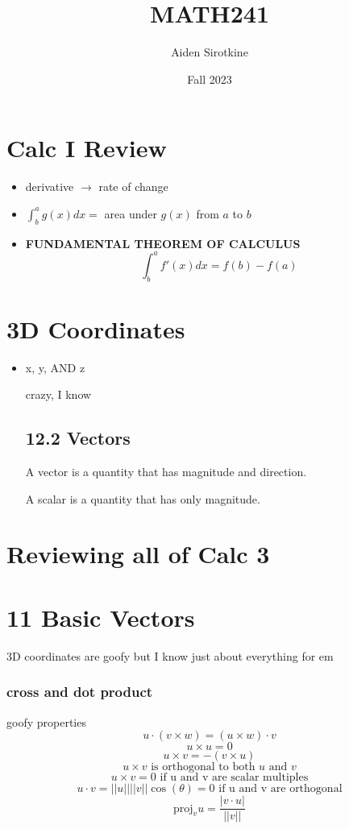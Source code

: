 \documentclass{report}
\date{Fall 2023}
\title{MATH241}
\author{Aiden Sirotkine}
\begin{document}
\pagestyle{fancy}
\maketitle
\tableofcontents


\chapter{Calc I Review}
\begin{itemize}
\item
derivative $\rightarrow$ rate of change

\item
$\int_b^a g(x) dx =$ area under $g(x)$ from $a$ to $b$

\item
\textbf{FUNDAMENTAL THEOREM OF CALCULUS}
$$
\int_b^a f'(x) dx = f(b) - f(a)
$$

\end{itemize}

\chapter{3D Coordinates}
\begin{itemize}
\item
x, y, AND z

crazy, I know

\section*{12.2 Vectors}
A vector is a quantity that has magnitude and direction.

A scalar is a quantity that has only magnitude.


\end{itemize}

\chapter{Reviewing all of Calc 3}


\chapter{11 Basic Vectors}
3D coordinates are goofy but I know just about everything for em

\subsection{cross and dot product}
goofy properties
$$
u \cdot (v \times w) = (u \times w) \cdot v
$$
$$
u \times u = 0
$$
$$
u \times v = -(v \times u)
$$
$$
u \times v \text{ is orthogonal to both } u \text{ and } v
$$
$$
u \times v = 0 \text{ if u and v are scalar multiples}
$$
$$
u \cdot v = 
||u||||v||\cos(\theta) =
0 \text{ if u and v are orthogonal}
$$
$$
\text{proj}_vu = \frac{| v \cdot u |}{||v||}
$$
\end{document}

